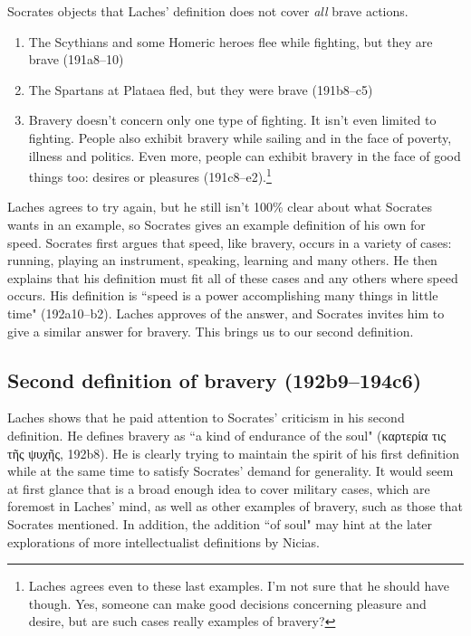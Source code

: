 \documentclass[11pt]{article}
\begin{document}
Socrates objects that Laches' definition does not cover \emph{all} brave actions.

\begin{enumerate}
    \item The Scythians and some Homeric heroes flee while fighting, but they are brave (191a8--10)
    \item The Spartans at Plataea fled, but they were brave (191b8--c5)
    \item Bravery doesn't concern only one type of fighting.  It isn't even limited to fighting.  People also exhibit bravery while sailing and in the face of poverty, illness and politics.  Even more, people can exhibit bravery in the face of good things too: desires or pleasures (191c8--e2).\footnote{Laches agrees even to these last examples.  I'm not sure that he should have though.  Yes, someone can make good decisions concerning pleasure and desire, but are such cases really examples of bravery?}
\end{enumerate}

Laches agrees to try again, but he still isn't 100\% clear about what Socrates wants in an example, so Socrates gives an example definition of his own for speed.  Socrates first argues that speed, like bravery, occurs in a variety of cases: running, playing an instrument, speaking, learning and many others.  He then explains that his definition must fit all of these cases and any others where speed occurs.  His definition is ``speed is a power accomplishing many things in little time" (192a10--b2).  Laches approves of the answer, and Socrates invites him to give a similar answer for bravery.  This brings us to our second definition.


\subsection{Second definition of bravery (192b9--194c6)}

Laches shows that he paid attention to Socrates' criticism in his second definition.  He defines bravery as ``a kind of endurance of the soul" (καρτερία τις τῆς ψυχῆς, 192b8).  He is clearly trying to maintain the spirit of his first definition while at the same time to satisfy Socrates' demand for generality.  It would seem at first glance that  is a broad enough idea to cover military cases, which are foremost in Laches' mind, as well as other examples of bravery, such as those that Socrates mentioned.  In addition, the addition ``of soul" may hint at the later explorations of more intellectualist definitions by Nicias.
\end{document}
